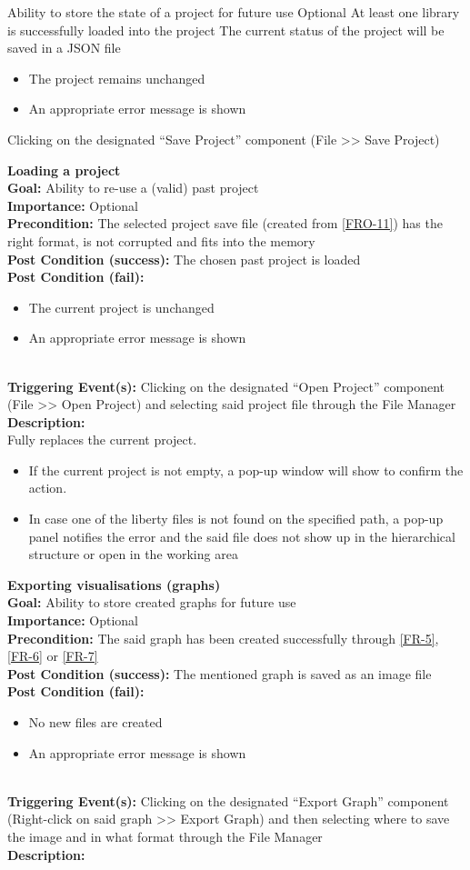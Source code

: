 \documentclass[10pt,a4paper]{report}
\newcommand{\precondition}[1]{
    \textbf{Precondition: } #1 \leavevmode \\
}
\newcommand{\FRODescription}[8]{
    \textbf{#1} \leavevmode \\
    \textbf{Goal: } #2 \leavevmode \\
    \textbf{Importance: } #3 \leavevmode \\
    \precondition{#4}
    \textbf{Post Condition (success): } #5 \leavevmode \\
    \textbf{Post Condition (fail): } #6 \leavevmode \\
    \textbf{Triggering Event(s): } #7 \leavevmode \\
    \textbf{Description: } \leavevmode \\
    #8}
\begin{document}
\begin{FRO}
    {Ability to store the state of a project for future use}
    {Optional}
    {At least one library is successfully loaded into the project}
    {The current status of the project will be saved in a JSON file}
    {\begin{itemize}
        \item The project remains unchanged
        \item An appropriate error message is shown
    \end{itemize}}
    {Clicking on the designated “Save Project” component (File >> Save Project)}
    \item \FRODescription{Loading a project\label{FRO-12}}
    {Ability to re-use a (valid) past project}
    {Optional}
    {The selected project save file (created from \ref{FRO-11}) has the right format, is not corrupted and fits into the memory}
    {The chosen past project is loaded}
    {\begin{itemize}
        \item The current project is unchanged
        \item An appropriate error message is shown
    \end{itemize}}
    {Clicking on the designated “Open Project” component (File >> Open Project) and selecting said project file through the File Manager}
    {Fully replaces the current project. 
    \begin{itemize}
    \item If the current project is not empty, a pop-up window will show to confirm the action. 
    \item In case one of the liberty files is not found on the specified path, a pop-up panel notifies the error and the said file does not show up in the hierarchical structure or open in the working area
    \end{itemize}}
    \item \FRODescription{Exporting visualisations (graphs)\label{FRO-13}}
    {Ability to store created graphs for future use}
    {Optional}
    {The said graph has been created successfully through \ref{FR-5}, \ref{FR-6} or \ref{FR-7}}
    {The mentioned graph is saved as an image file}
    {\begin{itemize}
        \item No new files are created
        \item An appropriate error message is shown
    \end{itemize}}
    {Clicking on the designated “Export Graph” component (Right-click on said graph >> Export Graph) and then selecting where to save the image and in what format through the File Manager}

\end{FRO}
\end{document}
